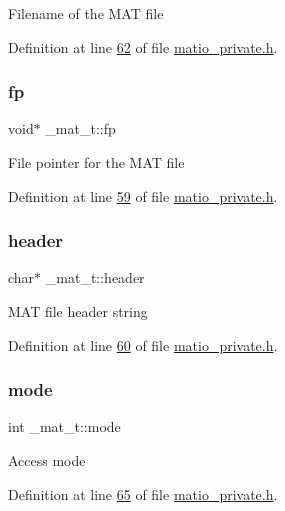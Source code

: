 Filename of the M\+AT file 

Definition at line \hyperlink{matio__private_8h_source_l00062}{62} of file \hyperlink{matio__private_8h_source}{matio\+\_\+private.\+h}.

\mbox{\label{struct__mat__t_a85f562e407ca9ad4d2a6e14f839432b7}} 
\subsubsection{\texorpdfstring{fp}{fp}}
{\footnotesize\ttfamily void$\ast$ \+\_\+mat\+\_\+t\+::fp}

File pointer for the M\+AT file 

Definition at line \hyperlink{matio__private_8h_source_l00059}{59} of file \hyperlink{matio__private_8h_source}{matio\+\_\+private.\+h}.

\mbox{\label{struct__mat__t_a5ed5d0e4e3c4d76b626a8a1772d579c4}} 
\subsubsection{\texorpdfstring{header}{header}}
{\footnotesize\ttfamily char$\ast$ \+\_\+mat\+\_\+t\+::header}

M\+AT file header string 

Definition at line \hyperlink{matio__private_8h_source_l00060}{60} of file \hyperlink{matio__private_8h_source}{matio\+\_\+private.\+h}.

\mbox{\label{struct__mat__t_aa43288b63b8edb7cadf0b79e2d1df2ee}} 
\subsubsection{\texorpdfstring{mode}{mode}}
{\footnotesize\ttfamily int \+\_\+mat\+\_\+t\+::mode}

Access mode 

Definition at line \hyperlink{matio__private_8h_source_l00065}{65} of file \hyperlink{matio__private_8h_source}{matio\+\_\+private.\+h}.

